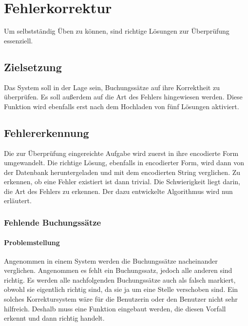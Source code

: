 \documentclass[12pt]{report}
\begin{document}
\chapter{Fehlerkorrektur}
 
Um selbstständig Üben zu können, sind richtige Lösungen zur Überprüfung essenziell.

\section{Zielsetzung}
Das System soll in der Lage sein, Buchungssätze auf ihre Korrektheit zu überprüfen. Es soll außerdem auf die Art des Fehlers hingewiesen werden. Diese Funktion wird ebenfalls erst nach dem Hochladen von fünf Lösungen aktiviert.

\section{Fehlererkennung}
Die zur Überprüfung eingereichte Aufgabe wird zuerst in ihre encodierte Form umgewandelt. Die richtige Lösung, ebenfalls in encodierter Form, wird dann von der Datenbank heruntergeladen und mit dem encodierten String verglichen. Zu erkennen, ob eine Fehler existiert ist dann trivial. Die Schwierigkeit liegt darin, die Art des Fehlers zu erkennen. Der dazu entwickelte Algorithmus wird nun erläutert.

\subsection{Fehlende Buchungssätze}

\subsubsection{Problemstellung}
Angenommen in einem System werden die Buchungssätze nacheinander verglichen. Angenommen es fehlt ein Buchungssatz, jedoch alle anderen sind richtig. Es werden alle nachfolgenden Buchungssätze auch als falsch markiert, obwohl sie eigentlich richtig sind, da sie ja um eine Stelle verschoben sind. Ein solches Korrektursystem wäre für die Benutzerin oder den Benutzer nicht sehr hilfreich. Deshalb muss eine Funktion eingebaut werden, die diesen Vorfall erkennt und dann richtig handelt. 
\end{document}
